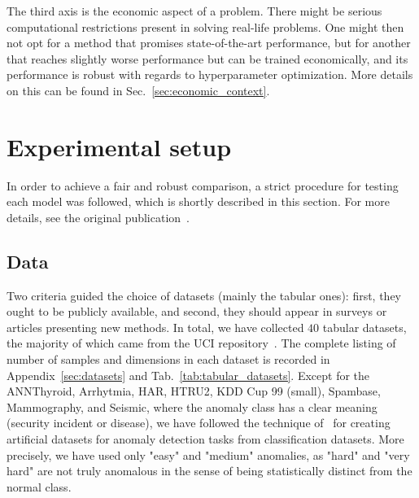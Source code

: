 The third axis is the economic aspect of a problem. There might be serious computational restrictions present in solving real-life problems. One might then not opt for a method that promises state-of-the-art performance, but for another that reaches slightly worse performance but can be trained economically, and its performance is robust with regards to hyperparameter optimization. More details on this can be found in Sec.~\ref{sec:economic_context}.

\section{Experimental setup}
\label{sec:experimentalsetup}

In order to achieve a fair and robust comparison, a strict procedure for testing each model was followed, which is shortly described in this section. For more details, see the original publication~\cite{vskvara2021comparison}.

\subsection{Data}

Two criteria guided the choice of datasets (mainly the tabular ones): first, they ought to be publicly available, and second, they should appear in surveys or articles presenting new methods.  In total, we have collected $40$ tabular datasets, the majority of which came from the UCI repository~\cite{Dua:2019}. The complete listing of number of samples and dimensions in each dataset is recorded in Appendix~\ref{sec:datasets} and Tab.~\ref{tab:tabular_datasets}. Except for the ANNThyroid, Arrhytmia, HAR, HTRU2, KDD Cup 99 (small), Spambase, Mammography, and Seismic, where the anomaly class has a clear meaning (security incident or disease), we have followed the technique of~\cite{emmott2013systematic} for creating artificial datasets for anomaly detection tasks from classification datasets. More precisely, we have used only "easy" and "medium" anomalies, as "hard" and "very hard" are not truly anomalous in the sense of being statistically distinct from the normal class.

